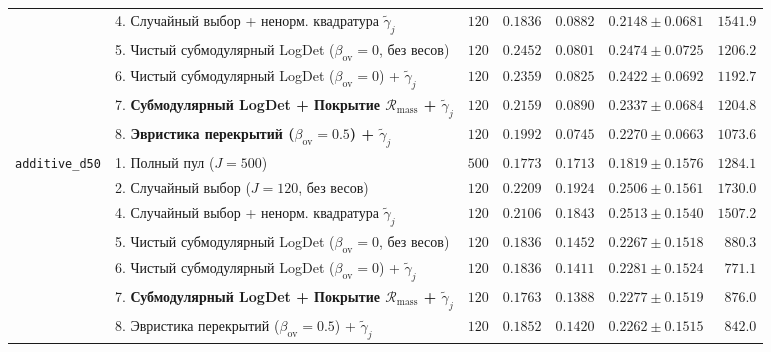 \documentclass[11pt,a4paper]{article}
\theoremstyle{definition}
\theoremstyle{remark}
\begin{document}
\begin{table}[ht!]
{\begin{tabular}{@{}llrrrrr@{}}
 & 4. Случайный выбор + ненорм. квадратура $\tilde{\gamma}_j$ & $120$ & $0.1836$ & $0.0882$ & $0.2148 \pm 0.0681$ & $1541.9$ \\
 & 5. Чистый субмодулярный LogDet ($\beta_{\mathrm{ov}}=0$, без весов) & $120$ & $0.2452$ & $0.0801$ & $0.2474 \pm 0.0725$ & $1206.2$ \\
 & 6. Чистый субмодулярный LogDet ($\beta_{\mathrm{ov}}=0$) + $\tilde{\gamma}_j$ & $120$ & $0.2359$ & $0.0825$ & $0.2422 \pm 0.0692$ & $1192.7$ \\
 & 7. \textbf{Субмодулярный LogDet + Покрытие $\mathcal{R}_{\mathrm{mass}}$ + $\tilde{\gamma}_j$} & $120$ & $0.2159$ & $0.0890$ & $0.2337 \pm 0.0684$ & $1204.8$ \\
 & 8. \textbf{Эвристика перекрытий ($\beta_{\mathrm{ov}}=0.5$) + $\tilde{\gamma}_j$} & $120$ & $\mathbf{0.1992}$ & $0.0745$ & $0.2270 \pm 0.0663$ & $\mathbf{1073.6}$ \\
\midrule
\texttt{additive\_d50} & 1. Полный пул ($J=500$) & $500$ & $0.1773$ & $0.1713$ & $0.1819 \pm 0.1576$ & $1284.1$ \\
 & 2. Случайный выбор ($J=120$, без весов) & $120$ & $0.2209$ & $0.1924$ & $0.2506 \pm 0.1561$ & $1730.0$ \\
 & 4. Случайный выбор + ненорм. квадратура $\tilde{\gamma}_j$ & $120$ & $0.2106$ & $0.1843$ & $0.2513 \pm 0.1540$ & $1507.2$ \\
 & 5. Чистый субмодулярный LogDet ($\beta_{\mathrm{ov}}=0$, без весов) & $120$ & $0.1836$ & $0.1452$ & $0.2267 \pm 0.1518$ & $880.3$ \\
 & 6. Чистый субмодулярный LogDet ($\beta_{\mathrm{ov}}=0$) + $\tilde{\gamma}_j$ & $120$ & $0.1836$ & $0.1411$ & $0.2281 \pm 0.1524$ & $\mathbf{771.1}$ \\
 & 7. \textbf{Субмодулярный LogDet + Покрытие $\mathcal{R}_{\mathrm{mass}}$ + $\tilde{\gamma}_j$} & $120$ & $\mathbf{0.1763}$ & $\mathbf{0.1388}$ & $0.2277 \pm 0.1519$ & $876.0$ \\
 & 8. Эвристика перекрытий ($\beta_{\mathrm{ov}}=0.5$) + $\tilde{\gamma}_j$ & $120$ & $0.1852$ & $0.1420$ & $\mathbf{0.2262 \pm 0.1515}$ & $842.0$ \\
\bottomrule
\end{tabular}%
}
\end{table}
\end{document}
